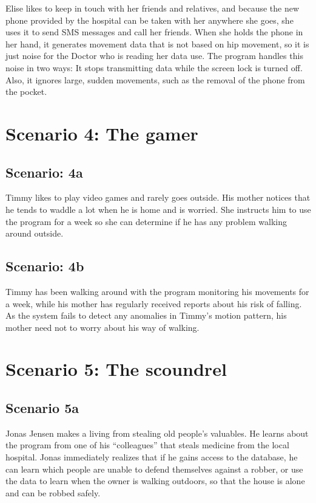 Elise likes to keep in touch with her friends and relatives, and because the new phone provided by the hospital can be taken with her anywhere she goes, she uses it to send SMS messages and call her friends. When she holds the phone in her hand, it generates movement data that is not based on hip movement, so it is just noise for the Doctor who is reading her data use. 
The program handles this noise in two ways: It stops transmitting data while the screen lock is turned off. Also, it ignores large, sudden movements, such as the removal of the phone from the pocket.

\section{Scenario 4: The gamer}

\subsection*{Scenario: 4a}

Timmy likes to play video games and rarely goes outside. His mother notices that he tends to waddle a lot when he is home and is worried. She instructs him to use the program for a week so she can determine if he has any problem walking around outside.

\subsection*{Scenario: 4b}

Timmy has been walking around with the program monitoring his movements for a week, while his mother has regularly received reports about his risk of falling. As the system fails to detect any anomalies in Timmy’s motion pattern, his mother need not to worry about his way of walking.

\section{Scenario 5: The scoundrel}

\subsection*{Scenario 5a}

Jonas Jensen makes a living from stealing old people’s valuables. He learns about the program from one of his “colleagues” that steals medicine from the local hospital. Jonas immediately realizes that if he gains access to the database, he can learn which people are unable to defend themselves against a robber, or use the data to learn when the owner is walking outdoors, so that the house is alone and can be robbed safely. 

